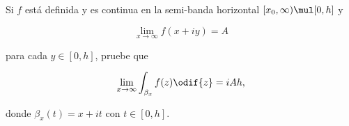 \documentclass[../main.tex]{subfiles}
\begin{document}
\begin{problema}
    Si \(f\) está definida y es continua en la semi-banda horizontal \([x_{0}, \infty)
    \mul [0, h]\) y

    \begin{equation*}
        \lim_{x \to \infty} f(x + iy) = A
    \end{equation*}

    para cada \(y\in [0, h]\), pruebe que

    \begin{equation*}
        \lim_{x \to \infty} \int_{\beta_{x}}^{}f(z)\odif{z} = iAh,
    \end{equation*}

    donde \(\beta_{x}(t) = x + it\) con \(t\in [0, h]\).
\end{problema}
\end{document}
